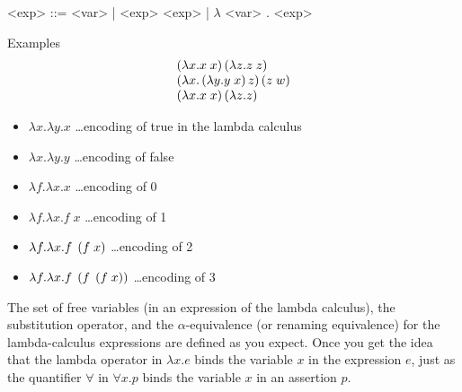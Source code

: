 \begin{center}
	\begin{minipage}{0.5\textwidth}
		\begin{grammar}
			<exp> ::= <var>
			| <exp> <exp> \footnotemark
			| $\lambda$ <var> . <exp> \footnotemark
		\end{grammar}
	\end{minipage}
\end{center}

\begin{enumcirc}
	\item
	Examples
	\[
		\begin{array}{l}
			\left( \lambda x. x \; x \right) \left( \lambda z. z \; z \right)           \\
			\left( \lambda x. \left( \lambda y. y \; x \right) z \right) \left( z \; w \right) \\
			\left( \lambda x. x \; x \right) \left( \lambda z. z \right)                \\
		\end{array}
	\]
	\begin{itemize}
		\item
		      $\lambda x. \lambda y. x$ \dots encoding of true in the lambda calculus
		\item
		      $\lambda x. \lambda y. y$ \dots encoding of false
		\item
		      $\lambda f. \lambda x. x$ \dots encoding of 0
		\item
		      $\lambda f. \lambda x. f \; x$ \dots encoding of 1
		\item
		      $\lambda f. \lambda x. f \; \left( f \; x \right)$ \dots encoding of 2
		\item
		      $\lambda f. \lambda x. f \; \left( f \; \left( f \; x \right) \right)$ \dots encoding of 3
	\end{itemize}
	\item
	The set of free variables (in an expression of the lambda calculus), the
	substitution operator, and the $\alpha$-equivalence (or renaming equivalence)
	for the lambda-calculus expressions are defined as you expect.
	Once you get the idea that the lambda operator in $\lambda x. e$ binds the
	variable $x$ in the expression $e$, just as the quantifier $\forall$ in
	$\forall x. p$ binds the variable $x$ in an assertion $p$.
	\begin{enumrm}

\end{enumrm}
\end{enumcirc}
